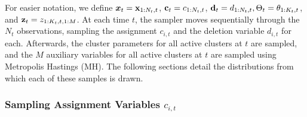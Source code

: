 \documentclass[twocolumn, final]{svjour3}
\begin{document}
For easier notation, we define $\boldsymbol{x}_{t} = \bold{x}_{1:N_{t},t}$, $\bold{c}_{t} = c_{1:N_{t},t}$, $\bold{d}_{t} = d_{1:N_{t},t}, \Theta_{t} = \theta_{1:K_{t}, t}$, and $\bold{z}_{t} = z_{1:K_{t},t,1:M}$.
At each time $t$, the sampler moves sequentially through the $N_{t}$ observations, sampling the assignment $c_{i,t}$ and the deletion variable $d_{i,t}$ for each. Afterwards, the cluster parameters for all active clusters at $t$ are sampled, and the $M$ auxiliary variables for all active clusters at $t$ are sampled using Metropolis Hastings (MH). The following sections detail the distributions from which each of these samples is drawn.





\subsubsection{Sampling Assignment Variables $c_{i,t}$}
\label{sec:sample_assignments}
\end{document}
